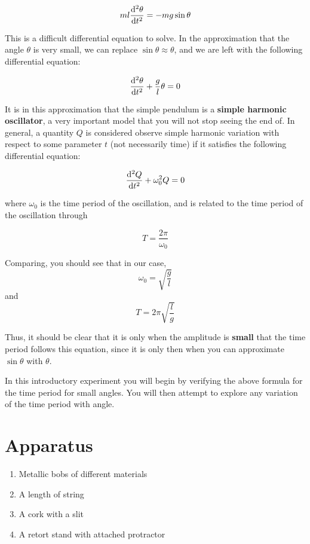 \begin{equation}
    m l \dv[2]{\theta}{t} = - m g \sin\theta
\end{equation}

This is a difficult differential equation to solve. In the approximation that the angle $\theta$ is very small, we can replace $\sin\theta \approx \theta$, and we are left with the following differential equation:

\begin{equation}
    \dv[2]{\theta}{t} + \frac{g}{l} \theta = 0
\end{equation}

It is in this approximation that the simple pendulum is a \textbf{simple harmonic oscillator}, a very important model that you will not stop seeing the end of. In general, a quantity $Q$ is considered observe simple harmonic variation with respect to some parameter $t$ (not necessarily time) if it satisfies the following differential equation:

\begin{equation*}
    \dv[2]{Q}{t} + \omega_0^2 Q = 0
\end{equation*}

where $\omega_0$ is the time period of the oscillation, and is related to the time period of the oscillation through 

\begin{equation*}
    T = \frac{2\pi}{\omega_0}
\end{equation*}

Comparing, you should see that in our case, $$\omega_0 = \sqrt{\frac{g}{l}}$$ and $$T = 2\pi \sqrt{\frac{l}{g}}$$

Thus, it should be clear that it is only when the amplitude is \textbf{small} that the time period follows this equation, since it is only then when you can approximate $\sin\theta$ with $\theta$.

In this introductory experiment you will begin by verifying the above formula for the time period for small angles. You will then attempt to explore any variation of the time period with angle.

\section{Apparatus}

\begin{enumerate}
    \item Metallic bobs of different materials
    \item A length of string
    \item A cork with a slit
    \item A retort stand with attached protractor
\end{enumerate}

